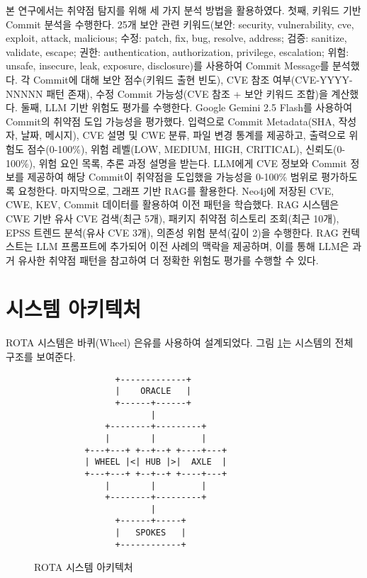 ﻿\documentclass[conference]{IEEEtran}
\begin{document}
본 연구에서는 취약점 탐지를 위해 세 가지 분석 방법을 활용하였다. 첫째, 키워드 기반 Commit 분석을 수행한다. 25개 보안 관련 키워드(보안: security, vulnerability, cve, exploit, attack, malicious; 수정: patch, fix, bug, resolve, address; 검증: sanitize, validate, escape; 권한: authentication, authorization, privilege, escalation; 위험: unsafe, insecure, leak, exposure, disclosure)를 사용하여 Commit Message를 분석했다. 각 Commit에 대해 보안 점수(키워드 출현 빈도), CVE 참조 여부(CVE-YYYY-NNNNN 패턴 존재), 수정 Commit 가능성(CVE 참조 + 보안 키워드 조합)을 계산했다. 둘째, LLM 기반 위험도 평가를 수행한다. Google Gemini 2.5 Flash를 사용하여 Commit의 취약점 도입 가능성을 평가했다. 입력으로 Commit Metadata(SHA, 작성자, 날짜, 메시지), CVE 설명 및 CWE 분류, 파일 변경 통계를 제공하고, 출력으로 위험도 점수(0-100\%), 위험 레벨(LOW, MEDIUM, HIGH, CRITICAL), 신뢰도(0-100\%), 위험 요인 목록, 추론 과정 설명을 받는다. LLM에게 CVE 정보와 Commit 정보를 제공하여 해당 Commit이 취약점을 도입했을 가능성을 0-100\% 범위로 평가하도록 요청한다. 마지막으로, 그래프 기반 RAG를 활용한다. Neo4j에 저장된 CVE, CWE, KEV, Commit 데이터를 활용하여 이전 패턴을 학습했다. RAG 시스템은 CWE 기반 유사 CVE 검색(최근 5개), 패키지 취약점 히스토리 조회(최근 10개), EPSS 트렌드 분석(유사 CVE 3개), 의존성 위험 분석(깊이 2)을 수행한다. RAG 컨텍스트는 LLM 프롬프트에 추가되어 이전 사례의 맥락을 제공하며, 이를 통해 LLM은 과거 유사한 취약점 패턴을 참고하여 더 정확한 위험도 평가를 수행할 수 있다.

\section{시스템 아키텍처}

ROTA 시스템은 바퀴(Wheel) 은유를 사용하여 설계되었다. 그림 \ref{fig:architecture}는 시스템의 전체 구조를 보여준다.

\begin{figure}[h]
\centering
\small
\begin{verbatim}
                +-------------+
                |    ORACLE   |
                +------+------+
                       |
              +--------+---------+
              |        |         |
          +---+---+ +--+--+ +----+---+
          | WHEEL |<| HUB |>|  AXLE  |
          +---+---+ +--+--+ +----+---+
              |        |         |
              +--------+---------+
                       |
                +------+-----+
                |   SPOKES   |
                +------------+
\end{verbatim}
\caption{ROTA 시스템 아키텍처}
\label{fig:architecture}
\end{figure}
\end{document}
